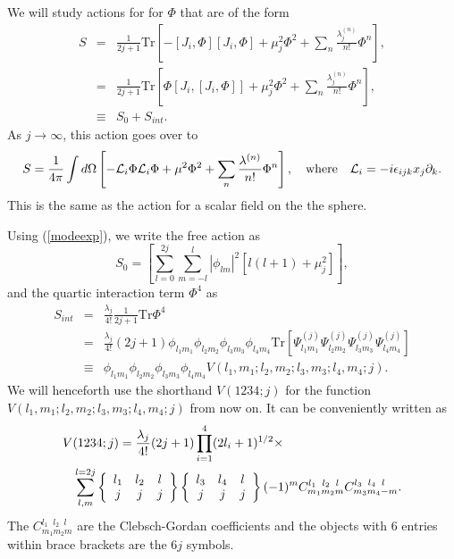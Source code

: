 \documentclass[a4paper,12pt]{article}
\numberwithin{equation}{section}
\begin{document}
We will study actions for for $\Phi$ that are of the form
\begin{eqnarray} 
S &=&  \frac{1}{2j+1}\text{Tr} \left[-[J_i, \Phi] [J_i,\Phi] + \mu_j^2
\Phi^2 + \sum_n \frac{\lambda_j^{(n)}}{n!} \Phi^n \right], \nonumber \\   
&=&  \frac{1}{2j+1} \text{Tr}\left[\Phi[J_i, [J_i, \Phi]] + \mu_j^2
\Phi^2 + \sum_n \frac{\lambda_j^{(n)}}{n!} \Phi^n \right], \nonumber \\  
&\equiv& S_0 + S_{int}.
\label{scalaraction}
\end{eqnarray}	 
As $j \rightarrow \infty$, this action goes over to
\begin{equation} 
S = \frac{1}{4 \pi} \int d \Omega \left[-{\cal L}_i \Phi {\cal L}_i
\Phi + \mu^2 \Phi^2 + \sum_n \frac{\lambda^{(n)}}{n!}  \Phi^n
\right], \quad \text{where}\quad {\cal L}_i = -i \epsilon_{ijk}x_j \partial_k. 
\end{equation} 
This is the same as the action for a scalar field on the the sphere.

Using (\ref{modeexp}), we write the free action as
\begin{equation} 
S_0 = \left[\sum_{l=0}^{2j} \sum_{m=-l}^l |\phi_{lm}|^2 [l(l+1) +
\mu_j^2] \right],  
\end{equation}
and the quartic interaction term $\Phi^4$ as
\begin{eqnarray}
S_{int} &=& \frac{\lambda_j}{4!}\frac{1}{2j+1} \text{Tr}\Phi^4 \nonumber \\
&=& \frac{\lambda_j}{4!} (2j+1) \phi_{l_1 m_1}\phi_{l_2 m_2}\phi_{l_3
m_3}\phi_{l_4 m_4} \text{Tr}[\Psi^{(j)}_{l_1 m_1}\Psi^{(j)}_{l_2
m_2}\Psi^{(j)}_{l_3 m_3}\Psi^{(j)}_{l_4 m_4}] \nonumber \\ 
&\equiv&\phi_{l_1 m_1}\phi_{l_2 m_2}\phi_{l_3 m_3}\phi_{l_4
m_4}V(l_1,m_1;l_2,m_2;l_3,m_3;l_4,m_4;j).  
\end{eqnarray}
We will henceforth use the shorthand $V(1234;j)$ for the function
$V(l_1,m_1;l_2,m_2;l_3,m_3;l_4,m_4;j)$ from now on. It can be
conveniently written as
\begin{eqnarray} 	 
\lefteqn{V(1234;j) = \frac{\lambda_j}{4!} (2j+1)\prod_{i=1}^{4}(2l_i
+1)^{1/2} \times} \nonumber \\
&& \sum_{l,m}^{l=2j} \left\{ \begin{array}{ccc}
				l_1 & l_2 & l \\
				j   & j   & j
			  \end{array} \right\} \left\{ \begin{array}{ccc}
						l_3 & l_4 & l \\
						j   & j   & j
			  			\end{array} \right\}
(-1)^m C_{m_1 m_2 m}^{l_1\;\; l_2\;\; l} C_{m_3 m_4 -m}^{l_3\;\; l_4\;\; l}.
\label{quarticint}
\end{eqnarray}
The $C_{m_1 m_2 m}^{l_1\;\; l_2\;\; l}$ are the Clebsch-Gordan
coefficients and the objects with 6 entries within brace brackets are
the $6j$ symbols.
\end{document}
